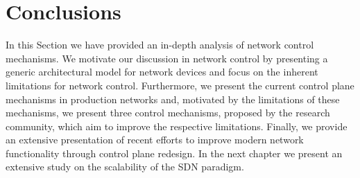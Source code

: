 \section{Conclusions}

In this Section we have provided an in-depth analysis of network control
mechanisms.  We motivate our discussion in network control by presenting a
generic architectural model for network devices and focus on the inherent
limitations for network control. Furthermore, we present the current control
plane mechanisms in production networks and, motivated by the limitations of
these mechanisms, we present three control mechanisms, proposed by the research
community, which aim to improve the respective limitations. Finally, we provide
an extensive presentation of recent efforts to improve modern network
functionality through control plane redesign. In the next chapter we present an
extensive study on the scalability of the SDN paradigm. 
